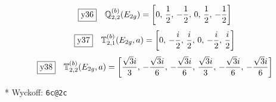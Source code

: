\documentclass[fleqn,10pt,landscape]{jsarticle}
\begin{document}
\begin{dmath*}
\fbox{y36}\quad \mathbb{Q}_{2,2}^{(b)}(E_{2g})=\left[ 0,\, \frac{1}{2},\, - \frac{1}{2},\, 0,\, \frac{1}{2},\, - \frac{1}{2} \right]
\end{dmath*}
\begin{dmath*}
\fbox{y37}\quad \mathbb{T}_{2,1}^{(b)}(E_{2g},a)=\left[ 0,\, - \frac{i}{2},\, \frac{i}{2},\, 0,\, - \frac{i}{2},\, \frac{i}{2} \right]
\end{dmath*}
\begin{dmath*}
\fbox{y38}\quad \mathbb{T}_{2,2}^{(b)}(E_{2g},a)=\left[ \frac{\sqrt{3} i}{3},\, - \frac{\sqrt{3} i}{6},\, - \frac{\sqrt{3} i}{6},\, \frac{\sqrt{3} i}{3},\, - \frac{\sqrt{3} i}{6},\, - \frac{\sqrt{3} i}{6} \right]
\end{dmath*}
\vspace{5mm}

\noindent ** Wyckoff: \texttt{6c@2c}
\end{document}
